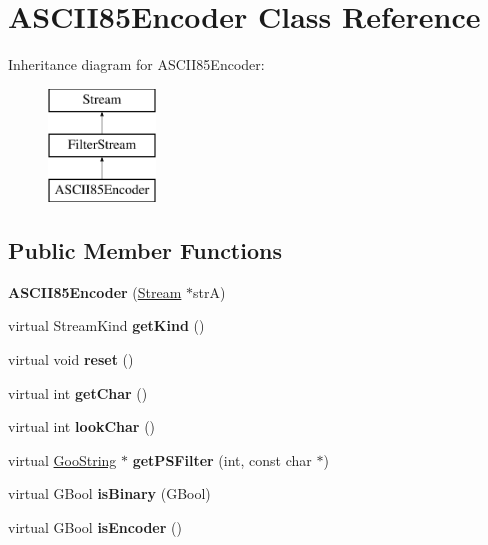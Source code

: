 \hypertarget{class_a_s_c_i_i85_encoder}{}\section{A\+S\+C\+I\+I85\+Encoder Class Reference}
\label{class_a_s_c_i_i85_encoder}
Inheritance diagram for A\+S\+C\+I\+I85\+Encoder\+:\begin{figure}[H]
\begin{center}
\leavevmode
\includegraphics[height=3.000000cm]{class_a_s_c_i_i85_encoder}
\end{center}
\end{figure}
\subsection*{Public Member Functions}
\begin{DoxyCompactItemize}
\item 
\mbox{\label{class_a_s_c_i_i85_encoder_a6a323049c36927830c5c88d60430047e}} 
{\bfseries A\+S\+C\+I\+I85\+Encoder} (\hyperlink{class_stream}{Stream} $\ast$strA)
\item 
\mbox{\label{class_a_s_c_i_i85_encoder_afb0aa1662a6afc5d5b159b74d67c81fe}} 
virtual Stream\+Kind {\bfseries get\+Kind} ()
\item 
\mbox{\label{class_a_s_c_i_i85_encoder_a24820d6bef825d7a2bca6b21d889e1ef}} 
virtual void {\bfseries reset} ()
\item 
\mbox{\label{class_a_s_c_i_i85_encoder_a7da2a6b6c56da592e825eb98b7b8649c}} 
virtual int {\bfseries get\+Char} ()
\item 
\mbox{\label{class_a_s_c_i_i85_encoder_af0ec7a84c92a96e464e2df1b7830d5c9}} 
virtual int {\bfseries look\+Char} ()
\item 
\mbox{\label{class_a_s_c_i_i85_encoder_afe36761c83f15f9774966ae993a550f3}} 
virtual \hyperlink{class_goo_string}{Goo\+String} $\ast$ {\bfseries get\+P\+S\+Filter} (int, const char $\ast$)
\item 
\mbox{\label{class_a_s_c_i_i85_encoder_a980d244d90455b4b5dab29295db8ec93}} 
virtual G\+Bool {\bfseries is\+Binary} (G\+Bool)
\item 
\mbox{\label{class_a_s_c_i_i85_encoder_a4c7fa27a196045d72b873e50a0040f74}} 
virtual G\+Bool {\bfseries is\+Encoder} ()
\end{DoxyCompactItemize}
